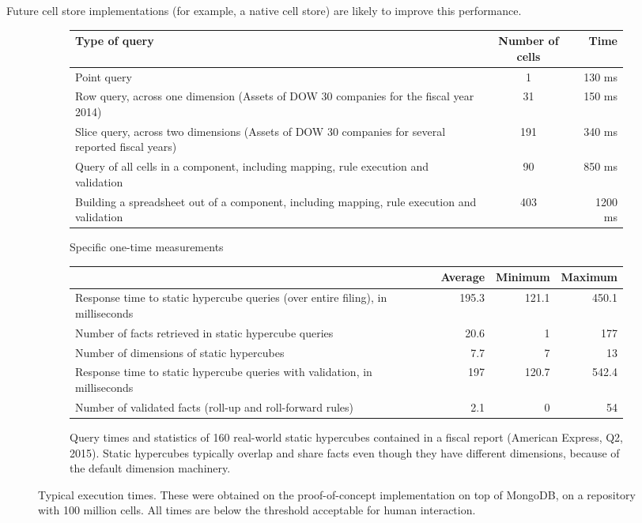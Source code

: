 \documentclass{acm_proc_article-sp}
\begin{document}
Future cell store implementations (for example, a native cell store) are likely to improve this performance.

\begin{figure*}

\begin{subfigure}[c]{\linewidth}
\centering
\begin{tabular}{lcr}
\hline
\hline
Type of query & Number of cells & Time \\
\hline
\hline
Point query & 1 & 130 ms \\
\hline
Row query, across one dimension (Assets of DOW 30 companies for the fiscal year 2014)&31& 150 ms \\
\hline
Slice query, across two dimensions (Assets of DOW 30 companies for several reported fiscal years)&191& 340 ms \\
\hline
Query of all cells in a component, including mapping, rule execution and validation& 90& 850 ms \\
\hline
Building a spreadsheet out of a component, including mapping, rule execution and validation & 403 & 1200 ms \\
\hline
\end{tabular}
\caption{Specific one-time measurements}
\end{subfigure}

\begin{subfigure}[c]{\linewidth}
\centering
\begin{tabular}{lrrr}
\hline
\hline
&Average & Minimum &Maximum\\
\hline
Response time to static hypercube queries (over entire filing), in milliseconds&195.3&121.1&450.1\\
Number of facts retrieved in static hypercube queries&20.6&1&177\\
Number of dimensions of static hypercubes&7.7&7&13\\
Response time to static hypercube queries with validation, in milliseconds&197&120.7&542.4\\
Number of validated facts (roll-up and roll-forward rules)&2.1&0&54\\
\hline
\end{tabular}
\caption{Query times and statistics of 160 real-world static hypercubes contained in a fiscal report (American Express, Q2, 2015). Static hypercubes typically overlap and share facts even though they have different dimensions, because of the default dimension machinery.}
\end{subfigure}

\vspace{3mm}
\caption{Typical execution times. These were obtained on the proof-of-concept implementation on top of MongoDB, on a repository with 100 million cells. All times are below the threshold acceptable for human interaction.}
\label{fig-measurements}
\end{figure*}
\end{document}
